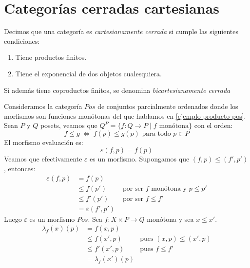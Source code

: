 \documentclass[12pt, twoside]{book}
\newcommand{\sii}{{\ \Leftrightarrow\ }}
\begin{document}
\section{Categorías cerradas cartesianas}
\begin{definition}
Decimos que una categoría es \emph{cartesianamente cerrada} si cumple las siguientes condiciones:
\begin{enumerate}
\item Tiene productos finitos.
\item Tiene el exponencial de dos objetos cualesquiera.
\end{enumerate}
Si además tiene coproductos finitos, se denomina \emph{bicartesianamente cerrada}
\end{definition}

\begin{example}
Consideramos la categoría $Pos$ de conjuntos parcialmente ordenados donde los morfismos son funciones monótonas del que hablamos en \ref{ejemplo-producto-pos}.
Sean $P$ y $Q$ posets, veamos que $Q^P = \{ f \colon Q \to P \mid f \text{ monótona}\}$ con el orden:
\[ f \leq g \sii f(p) \leq g(p) \text{ para todo }p \in P \]
El morfismo evaluación es:
\[ \varepsilon (f,p) = f(p) \]
Veamos que efectivamente $\varepsilon$ es un morfismo.
Supongamos que $(f,p) \leq (f',p')$, entonces:
\begin{align*}
\varepsilon(f,p) & = f(p) & \\
& \leq f(p') & \text{ por ser }f\text{ monótona y }p\leq p'\\
& \leq f'(p') & \text{ por ser }f \leq f'\\
& = \varepsilon(f',p')
\end{align*}
Luego $\varepsilon$ es un morfismo $Pos$.
Sea $f \colon X \times P \to Q$ monótona y sea $x \leq x'$.
\begin{align*}
\lambda_f(x)(p) & = f(x,p) & \\
& \leq f(x',p) & \text{pues }(x,p) \leq (x',p)\\
& \leq f'(x',p) & \text{pues }f \leq f'\\
& = \lambda_f(x')(p)
\end{align*}
\end{example}
\end{document}
